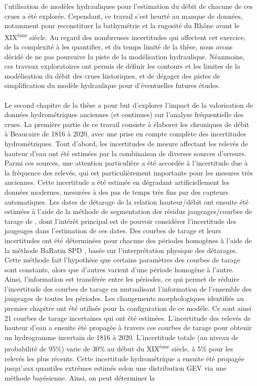 l'utilisation de modèles hydrauliques pour l'estimation du débit de chacune de ces crues a été explorée. Cependant, ce travail s'est heurté au manque de données, notamment pour reconstituer la bathymétrie et la rugosité du Rhône avant le XIX\textsuperscript{ème} siècle. Au regard des nombreuses incertitudes qui affectent cet exercice, de la complexité à les quantifier, et du temps limité de la thèse, nous avons décidé de ne pas poursuive la piste de la modélisation hydraulique. Néanmoins, ces travaux exploratoires ont permis de définir les contours et les limites de la modélisation du débit des crues historiques, et de dégager des pistes de simplification du modèle hydraulique pour d'éventuelles futures études.
	
	\paragraph{} Le second chapitre de la thèse a pour but d'explorer l'impact de la valorisation de données hydrométriques anciennes (et continues) sur l'analyse fréquentielle des crues. La première partie de ce travail consiste à élaborer les chroniques de débit à Beaucaire de 1816 à 2020, avec une prise en compte complète des incertitudes hydrométriques. Tout d'abord, les incertitudes de mesure affectant les relevés de hauteur d'eau ont été estimées par la combinaison de diverses sources d'erreurs. Parmi ces sources, une attention particulière a été accordée à l'incertitude due à la fréquence des relevés, qui est particulièrement importante pour les mesures très anciennes. Cette incertitude a été estimée en dégradant artificiellement les données modernes, mesurées à des pas de temps très fins par des capteurs automatiques. Les dates de détarage de la relation hauteur/débit ont ensuite été estimées à l'aide de la méthode de segmentation des résidus jaugeages/courbes de tarage de \citet{darienzo_detection_2021}, dont l'intérêt principal est de pouvoir considérer l'incertitude des jaugeages dans l'estimation de ces dates. Des courbes de tarage et leurs incertitudes ont été déterminées pour chacune des périodes homogènes à l'aide de la méthode BaRatin SPD \citep{mansanarez_shift_2019}, basée sur l'interprétation physique des détarages. Cette méthode fait l'hypothèse que certains paramètres des courbes de tarage sont constants, alors que d'autres varient d'une période homogène à l'autre. Ainsi, l'information est transférée entre les périodes, ce qui permet de réduire l'incertitude des courbes de tarage en mutualisant l'information de l'ensemble des jaugeages de toutes les périodes. Les changements morphologiques identifiés au premier chapitre ont été utilisés pour la configuration de ce modèle. Ce sont ainsi 21 courbes de tarage incertaines qui ont été estimées. L'incertitude des relevés de hauteur d'eau a ensuite été propagée à travers ces courbes de tarage pour obtenir un hydrogramme incertain de 1816 à 2020. L'incertitude totale (au niveau de probabilité de 95\%) varie de 30\% au début du XIX\textsuperscript{ème} siècle, à 5\% pour les relevés les plus récents. Cette incertitude hydrométrique a ensuite été propagée jusqu'aux quantiles extrêmes estimés selon une distribution GEV via une méthode bayésienne. Ainsi, on peut déterminer la 